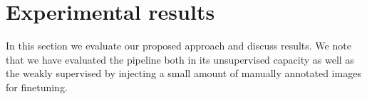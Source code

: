\documentclass{bmvc2k}
\begin{document}




\section{Experimental results}
In this section we  evaluate our proposed approach and discuss results. We note that we have evaluated the pipeline both in its unsupervised capacity as well as the weakly supervised by injecting a small amount of manually annotated images for finetuning. 
\end{document}
